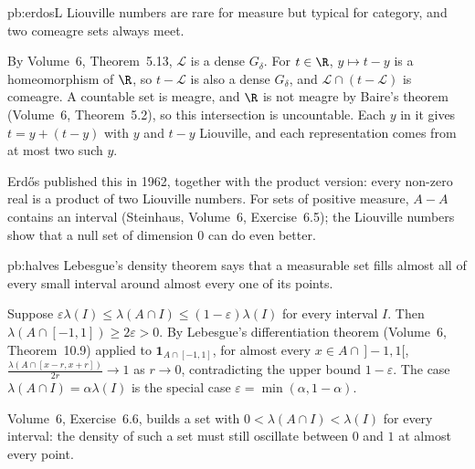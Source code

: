 \begin{solution}{pb:erdosL}
\idea Liouville numbers are rare for measure but typical for category, and two comeagre sets always meet.

\writeup By Volume~6, Theorem~5.13, $\mathcal L$ is a dense $G_\delta$. For $t\in\R$, $y\mapsto t-y$ is a homeomorphism of $\R$, so $t-\mathcal L$ is also a dense $G_\delta$, and
$\mathcal L\cap(t-\mathcal L)$ is comeagre. A countable set is meagre, and $\R$ is not meagre by Baire's theorem (Volume~6, Theorem~5.2), so this intersection is uncountable.
Each $y$ in it gives $t=y+(t-y)$ with $y$ and $t-y$ Liouville, and each representation comes from at most two such $y$.

\leads Erdős published this in 1962, together with the product version: every non-zero real is a product of two Liouville numbers. For sets of positive measure,
$A-A$ contains an interval (Steinhaus, Volume~6, Exercise~6.5); the Liouville numbers show that a null set of dimension $0$ can do even better.
\end{solution}

\begin{solution}{pb:halves}
\idea Lebesgue's density theorem says that a measurable set fills almost all of every small interval around almost every one of its points.

\writeup Suppose $\varepsilon\lambda(I)\le\lambda(A\cap I)\le(1-\varepsilon)\lambda(I)$ for every interval $I$. Then $\lambda(A\cap[-1,1])\ge2\varepsilon>0$. By Lebesgue's
differentiation theorem (Volume~6, Theorem~10.9) applied to $\mathbf 1_{A\cap[-1,1]}$, for almost every $x\in A\cap\,]-1,1[$,
$\frac{\lambda(A\cap[x-r,x+r])}{2r}\to1$ as $r\to0$, contradicting the upper bound $1-\varepsilon$. The case $\lambda(A\cap I)=\alpha\lambda(I)$ is the special case
$\varepsilon=\min(\alpha,1-\alpha)$.

\leads Volume~6, Exercise~6.6, builds a set with $0<\lambda(A\cap I)<\lambda(I)$ for every interval: the density of such a set must still oscillate between $0$ and $1$ at
almost every point.
\end{solution}

